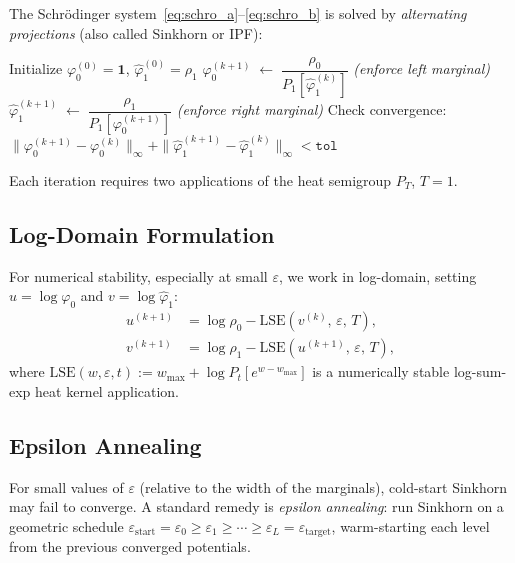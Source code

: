 \documentclass[11pt,a4paper]{article}
\newcommand{\eps}{\varepsilon}
\newcommand{\Pt}[1]{P_{#1}}   %
\begin{document}
The Schr\"{o}dinger system~\eqref{eq:schro_a}--\eqref{eq:schro_b} is solved
by \emph{alternating projections} (also called Sinkhorn or IPF):

\begin{algorithm}[H]
\caption{Hopf--Cole Sinkhorn iteration}
\begin{algorithmic}[1]
  \State Initialize $\varphi_0^{(0)} = \mathbf{1}$,\;
         $\hat\varphi_1^{(0)} = \rho_1$
    \State $\varphi_0^{(k+1)} \;\leftarrow\;
           \dfrac{\rho_0}{\Pt{1}[\hat\varphi_1^{(k)}]}$
           \hfill\textit{(enforce left marginal)}
    \State $\hat\varphi_1^{(k+1)} \;\leftarrow\;
           \dfrac{\rho_1}{\Pt{1}[\varphi_0^{(k+1)}]}$
           \hfill\textit{(enforce right marginal)}
    \State Check convergence:
           $\|\varphi_0^{(k+1)} - \varphi_0^{(k)}\|_\infty
           + \|\hat\varphi_1^{(k+1)} - \hat\varphi_1^{(k)}\|_\infty < \texttt{tol}$
  \EndFor
\end{algorithmic}
\end{algorithm}

Each iteration requires two applications of the heat semigroup
$\Pt{T}$, $T = 1$.

\subsection{Log-Domain Formulation}

For numerical stability, especially at small $\eps$, we work in
log-domain, setting $u = \log\varphi_0$ and $v = \log\hat\varphi_1$:
\begin{align}
  u^{(k+1)} &= \log\rho_0 - \mathrm{LSE}\!\left(v^{(k)},\,\eps,\,T\right),\\
  v^{(k+1)} &= \log\rho_1 - \mathrm{LSE}\!\left(u^{(k+1)},\,\eps,\,T\right),
\end{align}
where $\mathrm{LSE}(w, \eps, t) := w_{\max} + \log\Pt{t}[e^{w - w_{\max}}]$
is a numerically stable log-sum-exp heat kernel application.

\subsection{Epsilon Annealing}

For small values of $\eps$ (relative to the width of the marginals), cold-start
Sinkhorn may fail to converge. A standard remedy is \emph{epsilon annealing}:
run Sinkhorn on a geometric schedule
$\eps_{\mathrm{start}} = \eps_0 \geq \eps_1 \geq \cdots \geq \eps_L = \eps_{\mathrm{target}}$,
warm-starting each level from the previous converged potentials.
\end{document}
